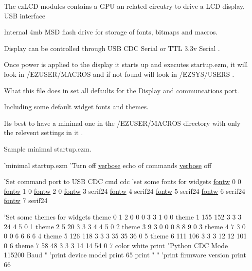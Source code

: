 The ez\-L\-C\-D modules contains a G\-P\-U an related circutry to drive a L\-C\-D display, U\-S\-B interface \par
 Internal 4mb M\-S\-D flash drive for storage of fonts, bitmaps and macros.\par
 Display can be controlled through U\-S\-B C\-D\-C Serial or T\-T\-L 3.\-3v Serial .\par
 \par
 Once power is applied to the display it starts up and executes startup.\-ezm, it will look in /\-E\-Z\-U\-S\-E\-R/\-M\-A\-C\-R\-O\-S and if not found will look in /\-E\-Z\-S\-Y\-S/\-U\-S\-E\-R\-S .\par
 What this file does in set all defaults for the Display and communcations port.\par
 Including some default widget fonts and themes. \par
 Its best to have a minimal one in the /\-E\-Z\-U\-S\-E\-R/\-M\-A\-C\-R\-O\-S directory with only the relevent settings in it . \par
 \par
 Sample minimal startup.\-ezm. 
\begin{DoxyCodeInclude}
\textcolor{stringliteral}{'minimal startup.ezm}
\textcolor{stringliteral}{}
\textcolor{stringliteral}{'}Turn off \hyperlink{group___general_ga350c2e1be0d3d074d79d7a7278c44a22}{verbose} echo of commands
\hyperlink{group___general_ga350c2e1be0d3d074d79d7a7278c44a22}{verbose} off

\textcolor{stringliteral}{'Set command port to USB CDC}
\textcolor{stringliteral}{cmd cdc}
\textcolor{stringliteral}{}
\textcolor{stringliteral}{'}set some fonts \textcolor{keywordflow}{for} widgets
\hyperlink{group___widgets_ga0efc2d431900e2b77a30e19bb556fb3a}{fontw} 0 0
\hyperlink{group___widgets_ga0efc2d431900e2b77a30e19bb556fb3a}{fontw} 1 0
\hyperlink{group___widgets_ga0efc2d431900e2b77a30e19bb556fb3a}{fontw} 2 0
\hyperlink{group___widgets_ga0efc2d431900e2b77a30e19bb556fb3a}{fontw} 3 serif24
\hyperlink{group___widgets_ga0efc2d431900e2b77a30e19bb556fb3a}{fontw} 4 serif24
\hyperlink{group___widgets_ga0efc2d431900e2b77a30e19bb556fb3a}{fontw} 5 serif24
\hyperlink{group___widgets_ga0efc2d431900e2b77a30e19bb556fb3a}{fontw} 6 serif24
\hyperlink{group___widgets_ga0efc2d431900e2b77a30e19bb556fb3a}{fontw} 7 serif24

\textcolor{stringliteral}{'Set some themes for widgets}
\textcolor{stringliteral}{theme 0   1   2 0 0 0  3  3   1 0 0}
\textcolor{stringliteral}{theme 1 155 152 3 3 3  24  4   5 0 1}
\textcolor{stringliteral}{theme 2   5  20 3 3 3  4  4   5 0 2}
\textcolor{stringliteral}{theme 3   9   3 0 0 0  8  8   9 0 3}
\textcolor{stringliteral}{theme 4   7   3 0 0 0  6  6   6 6 4}
\textcolor{stringliteral}{theme 5 126 118 3 3 3 35 35  36 0 5}
\textcolor{stringliteral}{theme 6 111 106 3 3 3 12 12 101 0 6}
\textcolor{stringliteral}{theme 7  58  48 3 3 3 14 14  54 0 7}
\textcolor{stringliteral}{}
\textcolor{stringliteral}{color white}
\textcolor{stringliteral}{print "Python CDC Mode 115200 Baud  "}
\textcolor{stringliteral}{'}print device model
print 65
print \textcolor{stringliteral}{"  "}
\textcolor{stringliteral}{'print firmware version}
\textcolor{stringliteral}{print 66}
\end{DoxyCodeInclude}
